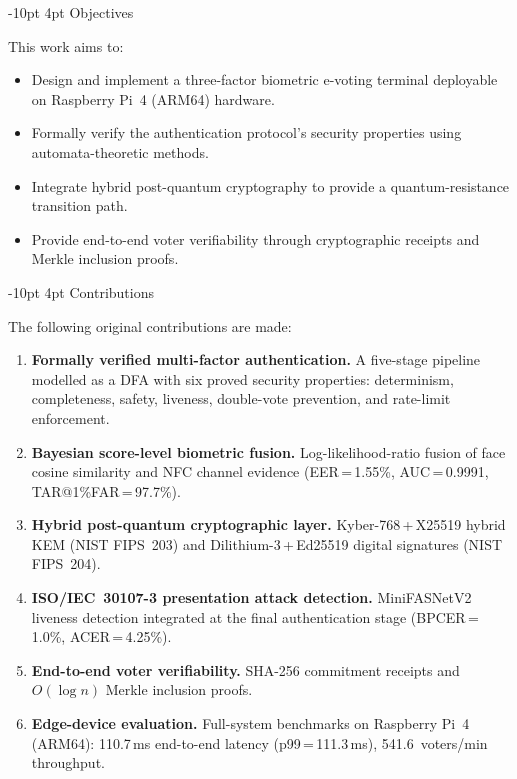 \documentclass[a4paper,12pt]{article}
\makeatletter
\renewcommand\subsection{\@startsection{subsection}{2}{\z@}%
  {-10pt \@plus -3pt \@minus -2pt}{4pt \@plus 2pt}%
  {\normalfont\normalsize\itshape}}
\makeatother
\begin{document}
\subsection{Objectives}

This work aims to:
\begin{itemize}
  \item Design and implement a three-factor biometric e-voting terminal
        deployable on Raspberry Pi~4 (ARM64) hardware.
  \item Formally verify the authentication protocol's security properties
        using automata-theoretic methods.
  \item Integrate hybrid post-quantum cryptography to provide a
        quantum-resistance transition path.
  \item Provide end-to-end voter verifiability through cryptographic
        receipts and Merkle inclusion proofs.
\end{itemize}

\subsection{Contributions}

The following original contributions are made:

\renewcommand{\labelenumi}{\textbf{C\arabic{enumi}.}}
\begin{enumerate}
  \item \textbf{Formally verified multi-factor authentication.}
        A five-stage pipeline modelled as a DFA with six proved security
        properties: determinism, completeness, safety, liveness,
        double-vote prevention, and rate-limit enforcement.
  \item \textbf{Bayesian score-level biometric fusion.}
        Log-likelihood-ratio fusion of face cosine similarity and NFC
        channel evidence (EER\,=\,1.55\%, AUC\,=\,0.9991,
        TAR@1\%FAR\,=\,97.7\%).
  \item \textbf{Hybrid post-quantum cryptographic layer.}
        Kyber-768\,+\,X25519 hybrid KEM (NIST FIPS~203) and
        Dilithium-3\,+\,Ed25519 digital signatures (NIST FIPS~204).
  \item \textbf{ISO/IEC~30107-3 presentation attack detection.}
        MiniFASNetV2 liveness detection integrated at the final
        authentication stage (BPCER\,=\,1.0\%, ACER\,=\,4.25\%).
  \item \textbf{End-to-end voter verifiability.}
        SHA-256 commitment receipts and $O(\log n)$ Merkle inclusion
        proofs.
  \item \textbf{Edge-device evaluation.}
        Full-system benchmarks on Raspberry Pi~4 (ARM64): 110.7\,ms
        end-to-end latency (p99\,=\,111.3\,ms), 541.6~voters/min
        throughput.
\end{enumerate}
\renewcommand{\labelenumi}{\arabic{enumi}.}
\end{document}
